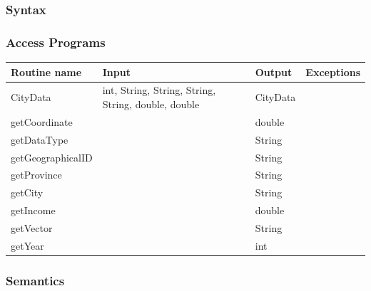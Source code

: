 \documentclass[12pt,fleqn]{article}
\begin{document}
\subsubsection* {Syntax}

\subsubsection* {Access Programs}
\begin{tabular}{| l | l | l | l |}
\hline
\textbf{Routine name} & \textbf{Input} & \textbf{Output} & \textbf{Exceptions}\\
\hline
CityData & int, String, String, String, String, double, double & CityData & ~\\
\hline
 getCoordinate& ~ & double & ~\\
\hline
getDataType & ~ & String & ~\\
\hline
getGeographicalID & ~ & String & ~\\
\hline
getProvince & ~ & String & ~\\
\hline
getCity & ~ & String & ~\\
\hline
getIncome & ~ & double & ~\\
\hline
getVector & ~ & String & ~\\
\hline
getYear & ~ & int & ~\\

\hline
\end{tabular}

\subsubsection*{Semantics}
\end{document}

